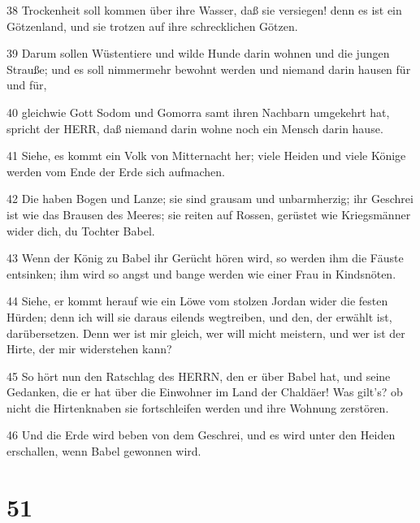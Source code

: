 \par 38 Trockenheit soll kommen über ihre Wasser, daß sie versiegen! denn es ist ein Götzenland, und sie trotzen auf ihre schrecklichen Götzen.
\par 39 Darum sollen Wüstentiere und wilde Hunde darin wohnen und die jungen Strauße; und es soll nimmermehr bewohnt werden und niemand darin hausen für und für,
\par 40 gleichwie Gott Sodom und Gomorra samt ihren Nachbarn umgekehrt hat, spricht der HERR, daß niemand darin wohne noch ein Mensch darin hause.
\par 41 Siehe, es kommt ein Volk von Mitternacht her; viele Heiden und viele Könige werden vom Ende der Erde sich aufmachen.
\par 42 Die haben Bogen und Lanze; sie sind grausam und unbarmherzig; ihr Geschrei ist wie das Brausen des Meeres; sie reiten auf Rossen, gerüstet wie Kriegsmänner wider dich, du Tochter Babel.
\par 43 Wenn der König zu Babel ihr Gerücht hören wird, so werden ihm die Fäuste entsinken; ihm wird so angst und bange werden wie einer Frau in Kindsnöten.
\par 44 Siehe, er kommt herauf wie ein Löwe vom stolzen Jordan wider die festen Hürden; denn ich will sie daraus eilends wegtreiben, und den, der erwählt ist, darübersetzen. Denn wer ist mir gleich, wer will micht meistern, und wer ist der Hirte, der mir widerstehen kann?
\par 45 So hört nun den Ratschlag des HERRN, den er über Babel hat, und seine Gedanken, die er hat über die Einwohner im Land der Chaldäer! Was gilt's? ob nicht die Hirtenknaben sie fortschleifen werden und ihre Wohnung zerstören.
\par 46 Und die Erde wird beben von dem Geschrei, und es wird unter den Heiden erschallen, wenn Babel gewonnen wird.

\chapter{51}

